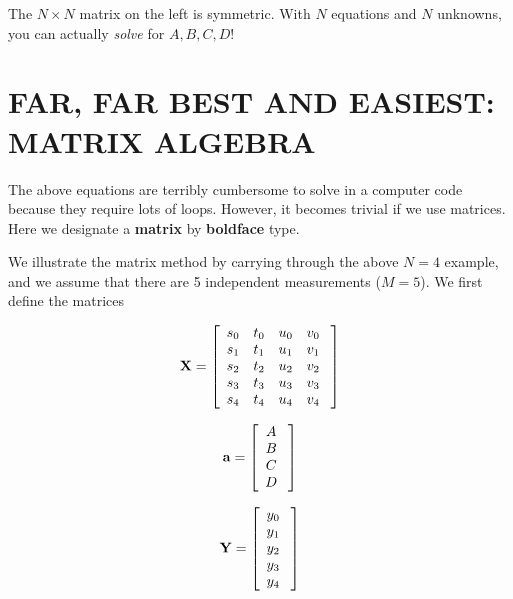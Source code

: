\documentclass[psfig,preprint]{aastex}
\begin{document}
\noindent The $N \times N$ matrix on the left is symmetric. With $N$
equations and $N$ unknowns, you can actually {\it solve} for $A, B, C,
D$! 

\section{FAR, FAR BEST AND EASIEST: MATRIX ALGEBRA} \label{matrixmethod}

	The above equations are terribly cumbersome to solve in a
computer code because they require lots of loops.  However, it becomes
trivial if we use matrices.  Here we designate a {\bf matrix} by {\bf
boldface} type. 

	We illustrate the matrix method by carrying through the above
$N=4$ example, and we assume that there are 5 independent measurements
($M=5$).  We first define the matrices

\begin{mathletters} \label{matrixdefinition}
\begin{eqnarray} 
{\bf X} = \left[
\begin{array}{cccc} 
{s_0} & {t_0} & {u_0} & {v_0} \\ 
{s_1} & {t_1} & {u_1} & {v_1} \\ 
{s_2} & {t_2} & {u_2} & {v_2} \\ 
{s_3} & {t_3} & {u_3} & {v_3} \\
{s_4} & {t_4} & {u_4} & {v_4} \\
\end{array} 
\; \right] 
\end{eqnarray}

\begin{eqnarray}
{\bf a} = \left[
\begin{array}{c}
A \\
B \\
C \\
D \\
\end{array} \; \right] 
\end{eqnarray}

\begin{eqnarray}
{\bf Y} = \left[
\begin{array}{c} 
{y_0} \\ 
{y_1} \\ 
{y_2} \\ 
{y_3} \\ 
{y_4} \\ 
\end{array} 
\; \right]
\end{eqnarray} 
\end{mathletters} 
\end{document}
